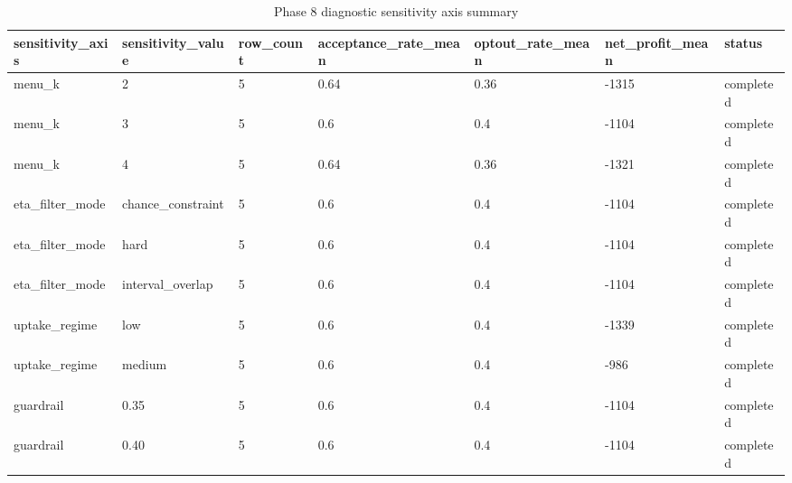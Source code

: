 \begin{table}[ht]
\centering
\begin{tabular}{lllllll}
 \hline
sensitivity\_axis & sensitivity\_value & row\_count & acceptance\_rate\_mean & optout\_rate\_mean & net\_profit\_mean & status \\
 \hline
menu\_k & 2 & 5 & 0.64 & 0.36 & -1315 & completed \\
menu\_k & 3 & 5 & 0.6 & 0.4 & -1104 & completed \\
menu\_k & 4 & 5 & 0.64 & 0.36 & -1321 & completed \\
eta\_filter\_mode & chance\_constraint & 5 & 0.6 & 0.4 & -1104 & completed \\
eta\_filter\_mode & hard & 5 & 0.6 & 0.4 & -1104 & completed \\
eta\_filter\_mode & interval\_overlap & 5 & 0.6 & 0.4 & -1104 & completed \\
uptake\_regime & low & 5 & 0.6 & 0.4 & -1339 & completed \\
uptake\_regime & medium & 5 & 0.6 & 0.4 & -986 & completed \\
guardrail & 0.35 & 5 & 0.6 & 0.4 & -1104 & completed \\
guardrail & 0.40 & 5 & 0.6 & 0.4 & -1104 & completed \\
 \hline
\end{tabular}
\caption{Phase 8 diagnostic sensitivity axis summary}
\end{table}
